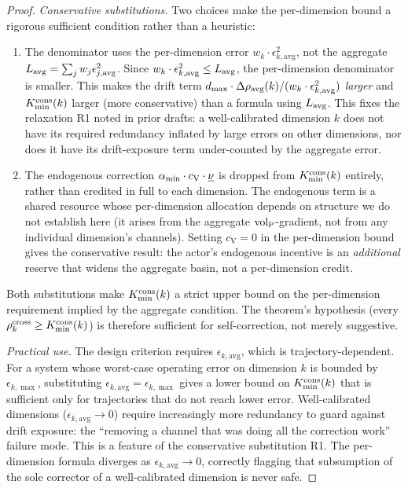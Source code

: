 \begin{proof}
\emph{Conservative substitutions.}  Two choices make the per-dimension
bound a rigorous sufficient condition rather than a heuristic:
\begin{enumerate}
\item[(R1)] The denominator uses the per-dimension error
  $w_k \cdot \epsilon_{k,\mathrm{avg}}^2$, not the aggregate
  $L_{\mathrm{avg}} = \sum_j w_j \epsilon_{j,\mathrm{avg}}^2$.
  Since $w_k \cdot \epsilon_{k,\mathrm{avg}}^2 \leq
  L_{\mathrm{avg}}$, the per-dimension denominator is smaller.
  This makes the drift term $d_{\mathrm{max}} \cdot \Delta\rho_{\mathrm{avg}}(k)
  / (w_k \cdot \epsilon_{k,\mathrm{avg}}^2)$ \emph{larger} and
  $K_{\mathrm{min}}^{\mathrm{cons}}(k)$ larger (more conservative) than a formula using
  $L_{\mathrm{avg}}$.  This fixes the relaxation R1 noted in prior
  drafts: a well-calibrated dimension $k$ does not have its required
  redundancy inflated by large errors on other dimensions, nor does
  it have its drift-exposure term under-counted by the aggregate
  error.
\item[(R2)] The endogenous correction $\alpha_{\min} \cdot c_{\mathrm{V}}
  \cdot \underline{\nu}$ is dropped from $K_{\mathrm{min}}^{\mathrm{cons}}(k)$ entirely,
  rather than credited in full to each dimension.  The endogenous
  term is a shared resource whose per-dimension allocation depends on
  structure we do not establish here (it arises from the aggregate
  ${\operatorname{vol}_{\mathrm{P}}}$-gradient, not from any individual dimension's channels).
  Setting $c_{\mathrm{V}} = 0$ in the per-dimension bound gives the
  conservative result: the actor's endogenous incentive is an
  \emph{additional} reserve that widens the aggregate basin, not a
  per-dimension credit.
\end{enumerate}
Both substitutions make $K_{\mathrm{min}}^{\mathrm{cons}}(k)$ a strict upper bound on the
per-dimension requirement implied by the aggregate condition.  The
theorem's hypothesis (every $\rho^{\mathrm{cross}}_k \geq K_{\mathrm{min}}^{\mathrm{cons}}(k)$) is
therefore sufficient for self-correction, not merely suggestive.

\emph{Practical use.}  The design criterion requires
$\epsilon_{k,\mathrm{avg}}$, which is trajectory-dependent.  For a
system whose worst-case operating error on dimension $k$ is bounded
by $\epsilon_{k,\max}$, substituting $\epsilon_{k,\mathrm{avg}} =
\epsilon_{k,\max}$ gives a lower bound on $K_{\mathrm{min}}^{\mathrm{cons}}(k)$ that is
sufficient only for trajectories that do not reach lower error.
Well-calibrated dimensions ($\epsilon_{k,\mathrm{avg}} \to 0$) require
increasingly more redundancy to guard against drift exposure: the
``removing a channel that was doing all the correction work'' failure
mode.  This is a feature of the conservative substitution R1.  The
per-dimension formula diverges as $\epsilon_{k,\mathrm{avg}} \to 0$,
correctly flagging that subsumption of the sole corrector of a
well-calibrated dimension is never safe.
\end{proof}

